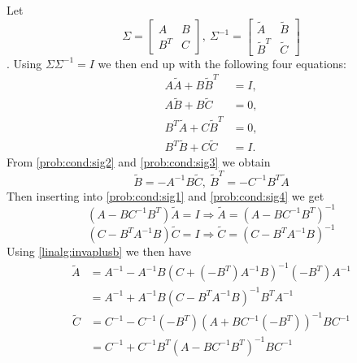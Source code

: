 Let
\begin{equation}
\Sigma = \begin{bmatrix}
A & B \\
B^T & C
\end{bmatrix},\ 
\Sigma^{-1} = \begin{bmatrix}
\tilde{A} & \tilde{B} \\
\tilde{B}^T & \tilde{C}
\end{bmatrix}
\end{equation}.
Using $\Sigma \Sigma^{-1}=I$ we then end up with the following four equations:
\begin{align}
A\tilde{A}+B\tilde{B}^T &= I, \label{prob:cond:sig1} \\
A\tilde{B} + B\tilde{C} &= 0, \label{prob:cond:sig2}\\
B^T\tilde{A} + C\tilde{B}^T &= 0, \label{prob:cond:sig3}\\
B^T\tilde{B} + C\tilde{C} &= I. \label{prob:cond:sig4}
\end{align}
From \eqref{prob:cond:sig2} and \eqref{prob:cond:sig3} we obtain
\begin{equation}
\tilde{B} = -A^{-1}B\tilde{C},\ \tilde{B}^T=-C^{-1}B^T\tilde{A}
\end{equation}
Then inserting into \eqref{prob:cond:sig1} and \eqref{prob:cond:sig4} we get
\begin{equation}
(A-BC^{-1}B^T)\tilde{A} = I \Rightarrow \tilde{A} = (A-BC^{-1}B^T)^{-1}
\end{equation}
\begin{equation}
(C-B^TA^{-1}B)\tilde{C} = I \Rightarrow \tilde{C} = (C-B^TA^{-1}B)^{-1}
\end{equation}
Using \eqref{linalg:invaplusb} we then have
\begin{align}
\tilde{A} &= A^{-1}-A^{-1}B(C+(-B^T)A^{-1}B)^{-1}(-B^T)A^{-1} \nonumber \\
&= A^{-1} + A^{-1}B(C-B^TA^{-1}B)^{-1}B^TA^{-1}
\end{align}
\begin{align}
\tilde{C} &= C^{-1} - C^{-1}(-B^T)(A+BC^{-1}(-B^T))^{-1}BC^{-1} \nonumber \\
&= C^{-1} + C^{-1}B^T(A-BC^{-1}B^T)^{-1}BC^{-1}
\end{align}